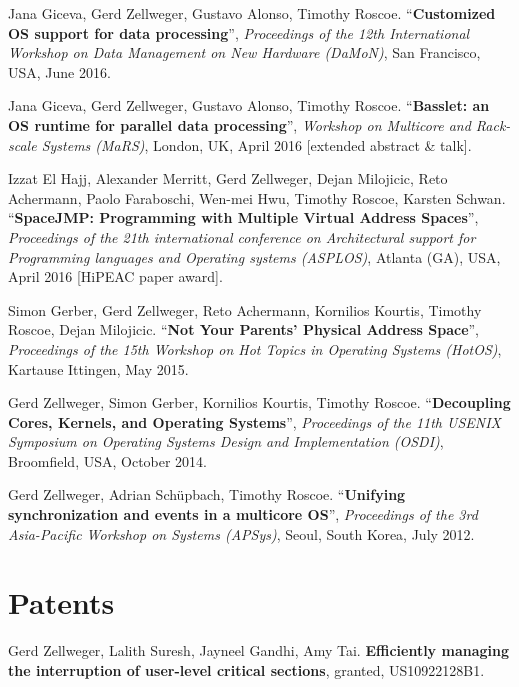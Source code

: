 \documentclass[margin,line]{cv/cv}
\begin{document}
\begin{resume}
    Jana Giceva, Gerd Zellweger, Gustavo Alonso, Timothy Roscoe.
    ``\textbf{Customized OS support for data processing}'',
    \textsl{Proceedings of the 12th International Workshop on Data Management on New Hardware (DaMoN)}, San Francisco, USA, June 2016.

    Jana Giceva, Gerd Zellweger, Gustavo Alonso, Timothy Roscoe.
    ``\textbf{Basslet: an OS runtime for parallel data processing}'',
    \textsl{Workshop on Multicore and Rack-scale Systems (MaRS)}, London, UK, April 2016 [extended abstract \& talk].

    Izzat El Hajj, Alexander Merritt, Gerd Zellweger, Dejan Milojicic, Reto Achermann, Paolo Faraboschi, Wen-mei Hwu, Timothy Roscoe, Karsten Schwan.
    ``\textbf{SpaceJMP: Programming with Multiple Virtual Address Spaces}'',  \textsl{Proceedings of the 21th international conference on Architectural support for Programming languages and Operating systems (ASPLOS)}, Atlanta (GA), USA, April 2016 [HiPEAC paper award].

    Simon Gerber, Gerd Zellweger, Reto Achermann, Kornilios Kourtis, Timothy Roscoe, Dejan Milojicic.
    ``\textbf{Not Your Parents' Physical Address Space}'', \textsl{Proceedings of the 15th Workshop on Hot Topics in Operating Systems (HotOS)}, Kartause Ittingen, May 2015.

    Gerd Zellweger, Simon Gerber, Kornilios Kourtis, Timothy Roscoe.
    ``\textbf{Decoupling Cores, Kernels, and Operating Systems}'',
    \textsl{Proceedings of the 11th USENIX Symposium on Operating Systems Design and Implementation (OSDI)}, Broomfield, USA, October 2014.

    Gerd Zellweger, Adrian Schüpbach, Timothy Roscoe.
    ``\textbf{Unifying synchronization and events in a multicore OS}'',
    \textsl{Proceedings of the 3rd Asia-Pacific Workshop on Systems (APSys)}, Seoul, South Korea, July 2012.



    \section{\mysidestyle Patents}

    Gerd Zellweger, Lalith Suresh, Jayneel Gandhi, Amy Tai.
    \textbf{Efficiently managing the interruption of user-level critical sections},
    granted, US10922128B1.


\end{resume}
\end{document}
